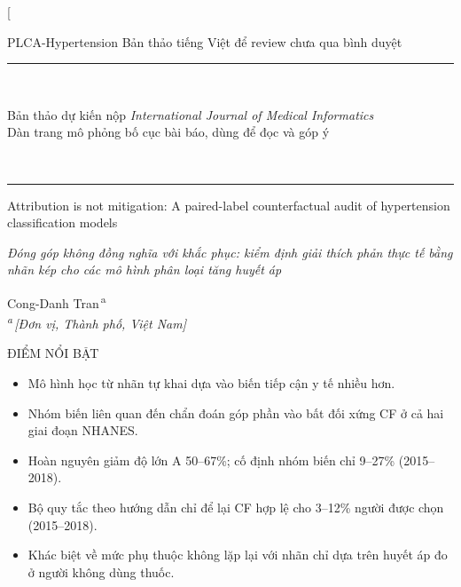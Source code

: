 \documentclass[9pt,a4paper]{extarticle}
\newcommand{\seclabel}[1]{{\fontsize{8}{10}\selectfont\addfontfeatures{LetterSpace=25}\MakeUppercase{#1}}\par\vspace{1pt}{\color{rulegray}\hrule height 0.4pt}\vspace{3pt}}
\begin{document}
\thispagestyle{first}

\twocolumn[{%
\begin{center}
{\small\color{elsblue} PLCA-Hypertension \textperiodcentered{} Bản thảo tiếng Việt để review \textperiodcentered{} chưa qua bình duyệt}\\[2pt]
{\color{rulegray}\rule{\textwidth}{0.4pt}}\\[-1pt]
\colorbox{bandgray}{\parbox{\dimexpr\textwidth-2\fboxsep}{\centering\vspace{5pt}
{\fontsize{17}{20}\selectfont\color{black!85} Bản thảo dự kiến nộp \textit{International Journal of Medical Informatics}}\\[3pt]
{\small\color{elsblue} Dàn trang mô phỏng bố cục bài báo, dùng để đọc và góp ý}\vspace{5pt}}}\\[-1pt]
{\color{elsblue}\rule{\textwidth}{1.6pt}}
\end{center}
\vspace{6pt}
{\raggedright\fontsize{17}{21}\selectfont Attribution is not mitigation: A paired-label counterfactual audit of hypertension classification models\par}
\vspace{4pt}
{\raggedright\large\itshape\color{black!75} Đóng góp không đồng nghĩa với khắc phục: kiểm định giải thích phản thực tế bằng nhãn kép cho các mô hình phân loại tăng huyết áp\par}
\vspace{8pt}
{\large Cong-Danh Tran\textsuperscript{\,a}}\\[3pt]
{\footnotesize\itshape \textsuperscript{a}\,[Đơn vị, Thành phố, Việt Nam]}
\vspace{10pt}

\seclabel{ĐIỂM NỔI BẬT}
\vspace{-2pt}
{\small\begin{itemize}[leftmargin=10pt,itemsep=0pt,topsep=2pt,label=\textbullet]
\item Mô hình học từ nhãn tự khai dựa vào biến tiếp cận y tế nhiều hơn.
\item Nhóm biến liên quan đến chẩn đoán góp phần vào bất đối xứng CF ở cả hai giai đoạn NHANES.
\item Hoàn nguyên giảm độ lớn A 50–67\%; cố định nhóm biến chỉ 9–27\% (2015–2018).
\item Bộ quy tắc theo hướng dẫn chỉ để lại CF hợp lệ cho 3–12\% người được chọn (2015–2018).
\item Khác biệt về mức phụ thuộc không lặp lại với nhãn chỉ dựa trên huyết áp đo ở người không dùng thuốc.
\end{itemize}}
\vspace{8pt}

}
\end{document}
